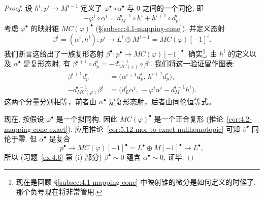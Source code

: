 \begin{proof}
设 $h^{i}:p^{i}\to M^{i-1}$ 定义了 $\varphi^\bullet\circ\alpha^\bullet$ 与 $0$ 之间的一个同伦, 即
\[
-\varphi^i\circ\alpha^i=d_M^{i-1}\circ h^i+h^{i+1}\circ d_p^i.
\]
考虑 $\varphi^\bullet$ 的映射锥 $MC(\varphi)^\bullet$ (\S\ref{subsec:4.1-mapping-cone}), 并定义态射
\[
\beta^i=(\alpha^i,h^i):p^i\longrightarrow L^i\oplus M^{i-1}=MC(\varphi)[-1]^i.
\]
我们断言这给出了一族复形态射 $\beta^\bullet:p^\bullet\to MC(\varphi)[-1]^\bullet$. 确实\footnote{现在是回顾 \S\ref{subsec:4.1-mapping-cone} 中映射锥的微分是如何定义的时候了. 那个负号现在将非常管用.}, 由 $h^{i}$ 的定义以及 $\alpha^\bullet$ 是复形态射, 有 $\beta^{i+1}\circ d_p^i=-d_{MC(\varphi)}^{i-1}\circ\beta^i$. 我们将这一验证留作图表:
\[
\begin{aligned}
\beta^{i+1}d_p^i
 &=\bigl(\alpha^{i+1}d_p^i,\,h^{i+1}d_p^i\bigr),\\
-d_{MC(\varphi)}^{i-1}\beta^i
 &=\bigl(d_L^i\alpha^i,\,-\varphi^i\alpha^i-d_M^{i-1}h^i\bigr).
\end{aligned}
\]
这两个分量分别相等，前者由 $\alpha^\bullet$ 是复形态射，后者由同伦恒等式。
\begin{center}
\end{center}
\indent 现在, 按假设 $\varphi^\bullet$ 是一个拟同构. 因此 $MC(\varphi)^\bullet$ 是一个正合复形 (推论~\ref{cor:4.2-mapping-cone-exact}). 应用推论~\ref{cor:5.12-mor-to-exact-nullhomotopic} 可知 $\beta^\bullet$ 同伦于零. 但 $\alpha^\bullet$ 是复合
\[
p^\bullet\longrightarrow MC(\varphi)[-1]^\bullet=L^\bullet\oplus M[-1]^\bullet\longrightarrow L^\bullet,
\]
所以 (习题~\ref{ex:4.6} 第 (i) 部分) $\beta^\bullet\sim 0$ 蕴含 $\alpha^\bullet\sim 0$, 证毕.
\end{proof}

